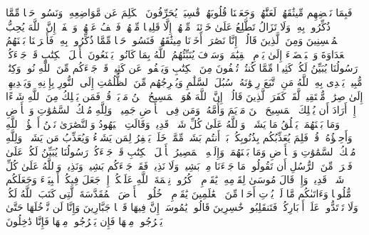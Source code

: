 \stopbuffer%
\startbuffer[\q:5:13]
فَبِمَا نَقۡضِهِم مِّیثَٰقَهُمۡ لَعَنَّٰهُمۡ وَجَعَلۡنَا قُلُوبَهُمۡ قَٰسِیَةࣰۖ یُحَرِّفُونَ ٱلۡكَلِمَ عَن مَّوَاضِعِهِۦ وَنَسُوا۟ حَظࣰّا مِّمَّا ذُكِّرُوا۟ بِهِۦۚ وَلَا تَزَالُ تَطَّلِعُ عَلَىٰ خَاۤئِنَةࣲ مِّنۡهُمۡ إِلَّا قَلِیلࣰا مِّنۡهُمۡۖ فَٱعۡفُ عَنۡهُمۡ وَٱصۡفَحۡۚ إِنَّ ٱللَّهَ یُحِبُّ ٱلۡمُحۡسِنِینَ%
\stopbuffer%
\startbuffer[\q:5:14]
وَمِنَ ٱلَّذِینَ قَالُوۤا۟ إِنَّا نَصَٰرَىٰۤ أَخَذۡنَا مِیثَٰقَهُمۡ فَنَسُوا۟ حَظࣰّا مِّمَّا ذُكِّرُوا۟ بِهِۦ فَأَغۡرَیۡنَا بَیۡنَهُمُ ٱلۡعَدَاوَةَ وَٱلۡبَغۡضَاۤءَ إِلَىٰ یَوۡمِ ٱلۡقِیَٰمَةِۚ وَسَوۡفَ یُنَبِّئُهُمُ ٱللَّهُ بِمَا كَانُوا۟ یَصۡنَعُونَ%
\stopbuffer%
\startbuffer[\q:5:15]
یَٰۤأَهۡلَ ٱلۡكِتَٰبِ قَدۡ جَاۤءَكُمۡ رَسُولُنَا یُبَیِّنُ لَكُمۡ كَثِیرࣰا مِّمَّا كُنتُمۡ تُخۡفُونَ مِنَ ٱلۡكِتَٰبِ وَیَعۡفُوا۟ عَن كَثِیرࣲۚ قَدۡ جَاۤءَكُم مِّنَ ٱللَّهِ نُورࣱ وَكِتَٰبࣱ مُّبِینࣱ%
\stopbuffer%
\startbuffer[\q:5:16]
یَهۡدِی بِهِ ٱللَّهُ مَنِ ٱتَّبَعَ رِضۡوَٰنَهُۥ سُبُلَ ٱلسَّلَٰمِ وَیُخۡرِجُهُم مِّنَ ٱلظُّلُمَٰتِ إِلَى ٱلنُّورِ بِإِذۡنِهِۦ وَیَهۡدِیهِمۡ إِلَىٰ صِرَٰطࣲ مُّسۡتَقِیمࣲ%
\stopbuffer%
\startbuffer[\q:5:17]
لَّقَدۡ كَفَرَ ٱلَّذِینَ قَالُوۤا۟ إِنَّ ٱللَّهَ هُوَ ٱلۡمَسِیحُ ٱبۡنُ مَرۡیَمَۚ قُلۡ فَمَن یَمۡلِكُ مِنَ ٱللَّهِ شَیۡءًا إِنۡ أَرَادَ أَن یُهۡلِكَ ٱلۡمَسِیحَ ٱبۡنَ مَرۡیَمَ وَأُمَّهُۥ وَمَن فِی ٱلۡأَرۡضِ جَمِیعࣰاۗ وَلِلَّهِ مُلۡكُ ٱلسَّمَٰوَٰتِ وَٱلۡأَرۡضِ وَمَا بَیۡنَهُمَاۚ یَخۡلُقُ مَا یَشَاۤءُۚ وَٱللَّهُ عَلَىٰ كُلِّ شَیۡءࣲ قَدِیرࣱ%
\stopbuffer%
\startbuffer[\q:5:18]
وَقَالَتِ ٱلۡیَهُودُ وَٱلنَّصَٰرَىٰ نَحۡنُ أَبۡنَٰۤؤُا۟ ٱللَّهِ وَأَحِبَّٰۤؤُهُۥۚ قُلۡ فَلِمَ یُعَذِّبُكُم بِذُنُوبِكُمۖ بَلۡ أَنتُم بَشَرࣱ مِّمَّنۡ خَلَقَۚ یَغۡفِرُ لِمَن یَشَاۤءُ وَیُعَذِّبُ مَن یَشَاۤءُۚ وَلِلَّهِ مُلۡكُ ٱلسَّمَٰوَٰتِ وَٱلۡأَرۡضِ وَمَا بَیۡنَهُمَاۖ وَإِلَیۡهِ ٱلۡمَصِیرُ%
\stopbuffer%
\startbuffer[\q:5:19]
یَٰۤأَهۡلَ ٱلۡكِتَٰبِ قَدۡ جَاۤءَكُمۡ رَسُولُنَا یُبَیِّنُ لَكُمۡ عَلَىٰ فَتۡرَةࣲ مِّنَ ٱلرُّسُلِ أَن تَقُولُوا۟ مَا جَاۤءَنَا مِنۢ بَشِیرࣲ وَلَا نَذِیرࣲۖ فَقَدۡ جَاۤءَكُم بَشِیرࣱ وَنَذِیرࣱۗ وَٱللَّهُ عَلَىٰ كُلِّ شَیۡءࣲ قَدِیرࣱ%
\stopbuffer%
\startbuffer[\q:5:20]
وَإِذۡ قَالَ مُوسَىٰ لِقَوۡمِهِۦ یَٰقَوۡمِ ٱذۡكُرُوا۟ نِعۡمَةَ ٱللَّهِ عَلَیۡكُمۡ إِذۡ جَعَلَ فِیكُمۡ أَنۢبِیَاۤءَ وَجَعَلَكُم مُّلُوكࣰا وَءَاتَىٰكُم مَّا لَمۡ یُؤۡتِ أَحَدࣰا مِّنَ ٱلۡعَٰلَمِینَ%
\stopbuffer%
\startbuffer[\q:5:21]
یَٰقَوۡمِ ٱدۡخُلُوا۟ ٱلۡأَرۡضَ ٱلۡمُقَدَّسَةَ ٱلَّتِی كَتَبَ ٱللَّهُ لَكُمۡ وَلَا تَرۡتَدُّوا۟ عَلَىٰۤ أَدۡبَارِكُمۡ فَتَنقَلِبُوا۟ خَٰسِرِینَ%
\stopbuffer%
\startbuffer[\q:5:22]
قَالُوا۟ یَٰمُوسَىٰۤ إِنَّ فِیهَا قَوۡمࣰا جَبَّارِینَ وَإِنَّا لَن نَّدۡخُلَهَا حَتَّىٰ یَخۡرُجُوا۟ مِنۡهَا فَإِن یَخۡرُجُوا۟ مِنۡهَا فَإِنَّا دَٰخِلُونَ%
